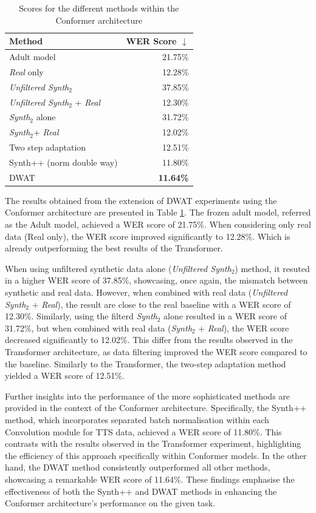 \begin{table}[h]
    \centering
    \begin{tabular}{lr}
        \toprule
        Method & WER Score $\downarrow$ \\
        \midrule
        Adult model & 21.75\% \\
        \textit{Real} only & 12.28\% \\ \hline
        \textit{Unfiltered Synth$_2$} & 37.85\% \\
        \textit{Unfiltered Synth$_2$} + \textit{Real} & 12.30\% \\ 
        \textit{Synth$_2$} alone & 31.72\% \\
        \textit{Synth$_2$}+ \textit{Real} & 12.02\% \\ 
        Two step adaptation & 12.51\% \\ \hline
        Synth++ (norm double way) & 11.80\% \\
        DWAT & \textbf{11.64\%} \\
        \bottomrule
    \end{tabular}
    \caption{Scores for the different methods within the Conformer architecture}
    \label{tab:DWAT_conformer}
\end{table}

The results obtained from the extension of DWAT experiments using the Conformer architecture are presented in Table \ref{tab:DWAT_conformer}. The frozen adult model, referred as the Adult model, achieved a WER score of 21.75\%. When considering only real data (Real only), the WER score improved significantly to 12.28\%. Which is already outperforming the best results of the Transformer.

When using unfiltered synthetic data alone (\textit{Unfiltered Synth$_2$}) method, it resuted in a higher WER score of 37.85\%, showcasing, once again, the mismatch between synthetic and real data. However, when combined with real data (\textit{Unfiltered Synth$_2$} + \textit{Real}), the result are close to the real baseline with a WER score of 12.30\%. Similarly, using the filterd \textit{Synth$_2$} alone resulted in a WER score of 31.72\%, but when combined with real data (\textit{Synth$_2$} + \textit{Real}), the WER score decreased significantly to 12.02\%. This differ from the results observed in the Transformer architecture, as data filtering improved the WER score compared to the baseline.
Similarly to the Transformer, the two-step adaptation method yielded a WER score of 12.51\%. 

Further insights into the performance of the more sophisticated methods are provided in the context of the Conformer architecture. Specifically, the Synth++ method, which incorporates separated batch normalisation within each Convolution module for TTS data, achieved a WER score of 11.80\%. This contrasts with the results observed in the Transformer experiment, highlighting the efficiency of this approach specifically within Conformer models. In the other hand, the DWAT method consistently outperformed all other methods, showcasing a remarkable WER score of 11.64\%. These findings emphasise the effectiveness of both the Synth++ and DWAT methods in enhancing the Conformer architecture's performance on the given task.


